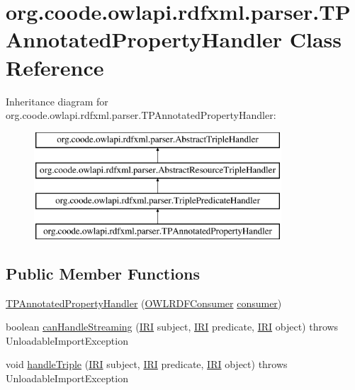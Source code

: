\hypertarget{classorg_1_1coode_1_1owlapi_1_1rdfxml_1_1parser_1_1_t_p_annotated_property_handler}{\section{org.\-coode.\-owlapi.\-rdfxml.\-parser.\-T\-P\-Annotated\-Property\-Handler Class Reference}
\label{classorg_1_1coode_1_1owlapi_1_1rdfxml_1_1parser_1_1_t_p_annotated_property_handler}
}
Inheritance diagram for org.\-coode.\-owlapi.\-rdfxml.\-parser.\-T\-P\-Annotated\-Property\-Handler\-:\begin{figure}[H]
\begin{center}
\leavevmode
\includegraphics[height=4.000000cm]{classorg_1_1coode_1_1owlapi_1_1rdfxml_1_1parser_1_1_t_p_annotated_property_handler}
\end{center}
\end{figure}
\subsection*{Public Member Functions}
\begin{DoxyCompactItemize}
\item 
\hyperlink{classorg_1_1coode_1_1owlapi_1_1rdfxml_1_1parser_1_1_t_p_annotated_property_handler_a0b25a8a8f4eb103394af78696e3d54c1}{T\-P\-Annotated\-Property\-Handler} (\hyperlink{classorg_1_1coode_1_1owlapi_1_1rdfxml_1_1parser_1_1_o_w_l_r_d_f_consumer}{O\-W\-L\-R\-D\-F\-Consumer} \hyperlink{classorg_1_1coode_1_1owlapi_1_1rdfxml_1_1parser_1_1_abstract_triple_handler_a4ccf4d898ff01eb1cadfa04b23d54e9c}{consumer})
\item 
boolean \hyperlink{classorg_1_1coode_1_1owlapi_1_1rdfxml_1_1parser_1_1_t_p_annotated_property_handler_a912a09ac6267511d10ed69995e026d31}{can\-Handle\-Streaming} (\hyperlink{classorg_1_1semanticweb_1_1owlapi_1_1model_1_1_i_r_i}{I\-R\-I} subject, \hyperlink{classorg_1_1semanticweb_1_1owlapi_1_1model_1_1_i_r_i}{I\-R\-I} predicate, \hyperlink{classorg_1_1semanticweb_1_1owlapi_1_1model_1_1_i_r_i}{I\-R\-I} object)  throws Unloadable\-Import\-Exception 
\item 
void \hyperlink{classorg_1_1coode_1_1owlapi_1_1rdfxml_1_1parser_1_1_t_p_annotated_property_handler_a4f9205d9e7a29426691274d947f6e16f}{handle\-Triple} (\hyperlink{classorg_1_1semanticweb_1_1owlapi_1_1model_1_1_i_r_i}{I\-R\-I} subject, \hyperlink{classorg_1_1semanticweb_1_1owlapi_1_1model_1_1_i_r_i}{I\-R\-I} predicate, \hyperlink{classorg_1_1semanticweb_1_1owlapi_1_1model_1_1_i_r_i}{I\-R\-I} object)  throws Unloadable\-Import\-Exception 
\end{DoxyCompactItemize}
